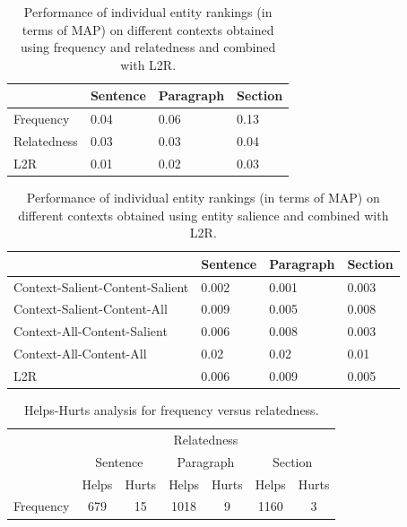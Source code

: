 \begin{table}[t]
\caption{Performance of individual entity rankings (in terms of MAP) on different contexts obtained using frequency and relatedness and combined with L2R.}
\label{tab:Results-Entity-Rankings-Freq-And-Rel}
\begin{tabular}{@{}llll@{}}
 \toprule
            & Sentence & Paragraph & Section \\ \midrule
Frequency   & 0.04     & 0.06      & 0.13    \\
Relatedness & 0.03     & 0.03      & 0.04    \\ \midrule
L2R         & 0.01     & 0.02      & 0.03   \\
 \bottomrule
\end{tabular}
\end{table}



\begin{table}[t]
\caption{Performance of individual entity rankings (in terms of MAP) on different contexts obtained using entity salience and combined with L2R.}
\label{tab:Results-Entity-Rankings-Sal}
\begin{tabular}{@{}llll@{}}
\toprule
                                & Sentence & Paragraph & Section \\ \midrule
Context-Salient-Content-Salient & 0.002    & 0.001     & 0.003   \\
Context-Salient-Content-All     & 0.009    & 0.005     & 0.008   \\
Context-All-Content-Salient     & 0.006    & 0.008     & 0.003   \\
Context-All-Content-All         & 0.02     & 0.02      & 0.01    \\ \midrule
L2R                             & 0.006    & 0.009     & 0.005   \\ \bottomrule
\end{tabular}
\end{table}

\begin{table}[t]
\caption{Helps-Hurts analysis for frequency versus relatedness.}
\label{tab:Helps-Hurts-Analysis}
\begin{tabular}{lcccccc}
\toprule
                                & \multicolumn{6}{c}{Relatedness}                                                              \\ 
                                & \multicolumn{2}{c}{Sentence} & \multicolumn{2}{c}{Paragraph} & \multicolumn{2}{c}{Section} \\ 
                                & Helps         & Hurts         & Helps          & Hurts         & Helps         & Hurts        \\ 
\midrule
\multicolumn{1}{c}{Frequency} & 679           & 15            & 1018           & 9             & 1160          & 3            \\ 
\bottomrule
\end{tabular}
\end{table}


